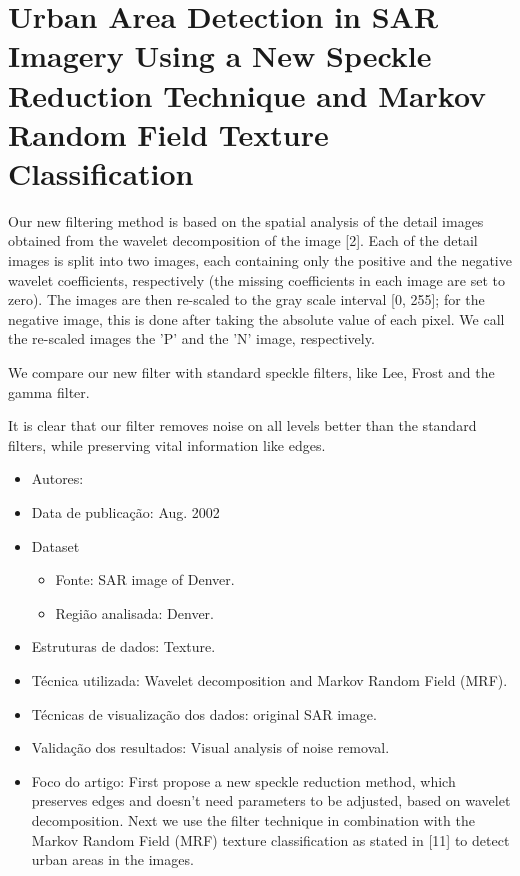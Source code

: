 \documentclass[paper=a4, fontsize=11pt]{scrartcl}
\begin{document}
\newpage

\section*{Urban Area Detection in SAR Imagery Using a New Speckle Reduction Technique and Markov Random Field Texture Classification}

Our new filtering method is based on the spatial analysis of the detail images obtained from the wavelet decomposition of the image [2].
Each of the detail images is split into two images, each containing only the positive and the negative wavelet coefficients, respectively (the missing coefficients in each image are set to zero). 
The images are then re-scaled to the gray scale interval [0, 255]; for the negative image, this is done after taking the absolute value of each pixel. 
We call the re-scaled images the 'P' and the 'N' image, respectively.

We compare our new filter with standard speckle filters, like Lee, Frost and the gamma filter.

It is clear that our filter removes noise on all levels better than the standard filters, while preserving vital information like edges.

\begin{itemize}
    \item Autores:~\cite{Duskunovic2000urban}
    \item Data de publicação: Aug. 2002
    \item Dataset
    \begin{itemize}
        \item Fonte: SAR image of Denver.
        \item Região analisada: Denver.
    \end{itemize}
    \item Estruturas de dados: Texture.
    \item Técnica utilizada: Wavelet decomposition and Markov Random Field (MRF).
    \item Técnicas de visualização dos dados: original SAR image.
    \item Validação dos resultados: Visual analysis of noise removal.
    \item Foco do artigo: First propose a new speckle reduction method, which preserves edges and doesn’t need parameters to be adjusted, based on wavelet decomposition. Next we use the filter technique in combination with the Markov Random Field (MRF) texture classification as stated in [11] to detect urban areas in the images.
\end{itemize}
\end{document}
